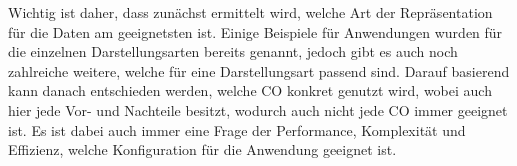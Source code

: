 \documentclass{llncs}
\begin{document}
	Wichtig ist daher, dass zunächst ermittelt wird, welche Art der Repräsentation für die Daten am geeignetsten ist. Einige Beispiele für Anwendungen wurden für die einzelnen Darstellungsarten bereits genannt, jedoch gibt es auch noch zahlreiche weitere, welche für eine Darstellungsart passend sind. Darauf basierend kann danach entschieden werden, welche CO konkret genutzt wird, wobei auch hier jede Vor- und Nachteile besitzt, wodurch auch nicht jede CO immer geeignet ist. Es ist dabei auch immer eine Frage der Performance, Komplexität und Effizienz, welche Konfiguration für die Anwendung geeignet ist.
	
\pagebreak
	
 

\end{document}
